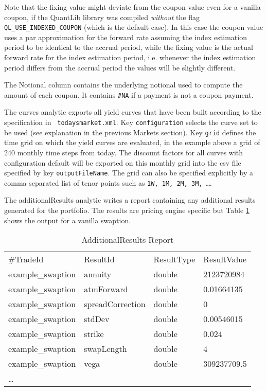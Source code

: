 {Note that the fixing value might deviate from the coupon value even for a vanilla coupon, if the QuantLib library was
compiled {\em without} the flag \verb+QL_USE_INDEXED_COUPON+ (which is the default case). In this case the coupon value
uses a par approximation for the forward rate assuming the index estimation period to be identical to the accrual
period, while the fixing value is the actual forward rate for the index estimation period, i.e. whenever the index estimation
period differs from the accrual period the values will be slightly different.

The Notional column contains the underlying notional used to compute the amount of each coupon. It contains \verb+#NA+
if a payment is not a coupon payment.

The curves analytic exports all yield curves that have been built according to the specification in {\tt
  todaysmarket.xml}. Key {\tt configuration} selects the curve set to be used (see explanation in the previous Markets
section).  Key {\tt grid} defines the time grid on which the yield curves are evaluated, in the example above a grid of
240 monthly time steps from today. The discount factors for all curves with configuration default will be exported on
this monthly grid into the csv file specified by key {\tt outputFileName}. The grid can also be specified explicitly by
a comma separated list of tenor points such as {\tt 1W, 1M, 2M, 3M, \dots}.

The additionalResults analytic writes a report containing any additional results generated for the portfolio. The results are pricing engine specific but Table \ref{additionalreport} shows the output for a vanilla swaption.

\begin{table}[hbt]
\scriptsize
\begin{center}
  \begin{tabular}{l|l|l|l}
\hline
\#TradeId & ResultId & ResultType & ResultValue \\
example\_swaption & annuity & double & 2123720984 \\
example\_swaption & atmForward & double & 0.01664135 \\
example\_swaption & spreadCorrection & double & 0 \\
example\_swaption & stdDev & double & 0.00546015 \\
example\_swaption & strike & double & 0.024 \\
example\_swaption & swapLength & double & 4 \\
example\_swaption & vega & double & 309237709.5 \\
\hline
\hline
\ldots
\end{tabular}
\caption{AdditionalResults Report}
\label{additionalreport}
\end{center}
\end{table}

}
